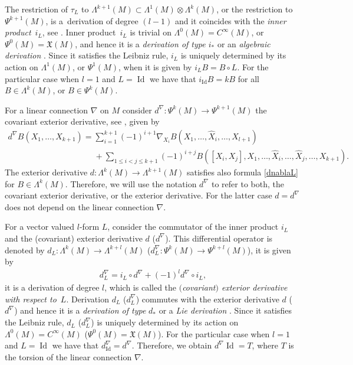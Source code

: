 The restriction of $\tau_L$ to $\Lambda^{k+1}(M)\subset
\Lambda^1(M) \otimes \Lambda^k(M)$, or the restriction to
$\Psi^{k+1}(M)$, is a~derivation of degree $(l-1)$ and it
coincides with the \emph{inner product}~$i_L$, see \cite{grifone00,
KMS93}.  Inner product~$i_L$
is trivial on $\Lambda^0(M)=C^{\infty}(M)$, or
$\Psi^0(M)=\mathfrak{X}(M)$, and hence it is a \emph{derivation of type
$i_*$} \cite{grifone00} or an \emph{algebraic derivation}
\cite{KMS93}. Since it satisf\/ies the Leibniz rule, $i_L$ is uniquely
determined by its action on $\Lambda^1(M)$, or $\Psi^1(M)$, when it is
given by $i_LB=B\circ L$. For the particular case when $l=1$ and $L=\operatorname{Id}$ we have that
$i_{\operatorname{Id}}B=kB$ for all $B\in \Lambda^k(M)$, or $B\in
\Psi^k(M)$.

For a linear connection $\nabla$ on $M$ consider
$d^{\nabla}:\Psi^k(M)\to \Psi^{k+1}(M)$ the covariant exterior
derivative, see \cite[\S~11.13]{KMS93}, given by
\begin{gather} \nonumber   d^{\nabla}B(X_1,\dots , X_{k+1}) =
\sum_{i=1}^{k+1}
(-1)^{i+1}\nabla_{X_i}B(X_1,\dots , \hat{X}_i, \dots , X_{l+1})  \\
\label{dnablaL}
\phantom{d^{\nabla}B(X_1,\dots , X_{k+1}) =}{}
+ \sum_{1\leq i<j\leq k+1} (-1)^{i+j}B([X_i,
X_j], X_1,\dots , \hat{X}_i,\dots , \hat{X}_j,\dots , X_{k+1}).\!\!\!
\end{gather} The exterior derivative $d: \Lambda^k(M)\to
\Lambda^{k+1}(M)$ satisf\/ies also formula \eqref{dnablaL} for $B\in
\Lambda^k(M)$. Therefore, we will use the notation $d^{\nabla}$ to refer to
both, the covariant exterior derivative, or the exterior
derivative. For the latter case $d=d^{\nabla}$ does not depend on
the linear connection $\nabla$.

For a vector valued $l$-form $L$, consider the commutator of the inner
product $i_L$ and the (covariant) exterior derivative $d$
($d^{\nabla}$). This dif\/ferential operator is
denoted by  $d_L: \Lambda^k(M) \to \Lambda^{k+l}(M)$ ($d^{\nabla}_L:
\Psi^k(M) \to \Psi^{k+l}(M)$), it is given by
\begin{gather} d^{\nabla}_L=i_L\circ d^{\nabla}+(-1)^{l}d^{\nabla}\circ i_L,
\label{dil}
\end{gather} it is a derivation of degree $l$, which is
called the \emph{$($covariant$)$ exterior derivative with respect to}~$L$. Derivation $d_L$ ($d^{\nabla}_L$) commutes with the exterior
derivative $d$ ($d^{\nabla}$) and hence it is a \emph{derivation of type}
$d_*$ \cite{grifone00} or a \emph{Lie derivation} \cite{KMS93}.
Since it satisf\/ies the Leibniz rule, $d_L$ ($d_{L}^{\nabla}$) is
uniquely determined by its action on $\Lambda^0(M)=C^{\infty}(M)$
($\Psi^0(M)={\mathfrak X}(M)$). For the particular case when $l=1$ and
$L=\operatorname{Id}$ we have that
$d^{\nabla}_{\operatorname{Id}}=d^{\nabla}$. Therefore, we obtain
$d^{\nabla}\operatorname{Id}=T$, where $T$ is the torsion of the linear
connection $\nabla$.

